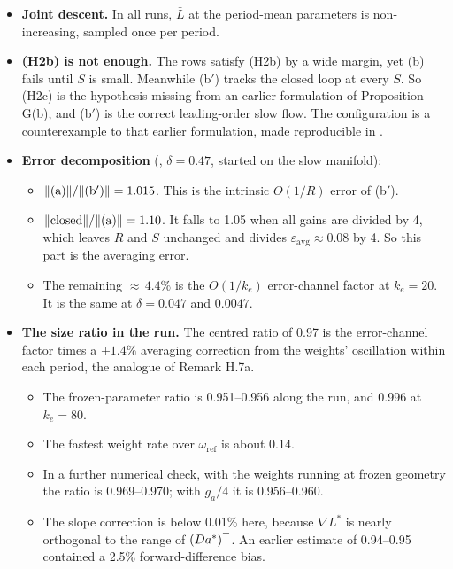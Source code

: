 \begin{itemize}
  \item \textbf{Joint descent.} In all runs, $\bar L$ at the period-mean parameters is non-increasing, sampled once per
    period.
  \item \textbf{(H2b) is not enough.} The  rows satisfy (H2b) by a wide margin, yet (b) fails until $S$ is
    small. Meanwhile (b$'$) tracks the closed loop at every $S$. So (H2c) is the hypothesis missing from an earlier
    formulation of Proposition G(b), and (b$'$) is the correct leading-order slow flow. The configuration is a
    counterexample to that earlier formulation, made reproducible in .
  \item \textbf{Error decomposition} (, $\delta = 0.47$, started on the slow manifold):
    \begin{itemize}
      \item $\lVert (\mathrm{a})\rVert/\lVert (\mathrm{b}')\rVert = 1.015$. This is the intrinsic $O(1/R)$ error of (b$'$).
      \item $\lVert \mathrm{closed}\rVert/\lVert (\mathrm{a})\rVert = 1.10$. It falls to 1.05 when all gains are divided by 4,
        which leaves $R$ and $S$ unchanged and divides $\varepsilon_{\mathrm{avg}}\approx0.08$ by 4. So this part is
        the averaging error.
      \item The remaining ${\approx}\,4.4\%$ is the $O(1/k_e)$ error-channel factor at $k_e = 20$. It is the same at
        $\delta = 0.047$ and $0.0047$.
    \end{itemize}
  \item \textbf{The size ratio in the  run.} The centred ratio of 0.97 is the error-channel factor
    times a $+1.4\%$ averaging correction from the weights' oscillation within each period, the analogue of Remark
    H.7a.
    \begin{itemize}
      \item The frozen-parameter ratio is 0.951--0.956 along the run, and 0.996 at $k_e = 80$.
      \item The fastest weight rate over $\omega_{\mathrm{ref}}$ is about 0.14.
      \item In a further numerical check, with the weights running at frozen geometry the ratio is 0.969--0.970;
        with $g_a/4$ it is 0.956--0.960.
      \item The slope correction is below 0.01\% here, because $\nabla L^*$ is nearly orthogonal to the range of
        $(Da^*)^\top$. An earlier estimate of 0.94--0.95 contained a 2.5\% forward-difference bias.

\end{itemize}
\end{itemize}
